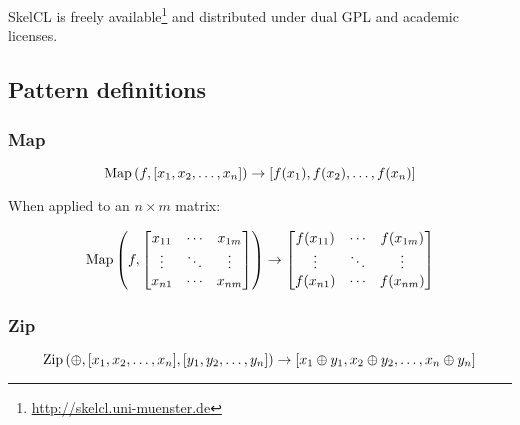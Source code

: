 SkelCL is freely
available\footnote{\url{http://skelcl.uni-muenster.de}} and
distributed under dual GPL and academic licenses.





\subsection{Pattern definitions}


\subsubsection{Map}

\begin{equation}
\operatorname*{Map}\left(f, [x_1,x_2,\ldots,x_n]\right) \to [f(x_1),f(x_2),\ldots,f(x_n)]
\end{equation}

When applied to an $n \times m$ matrix:

\begin{equation}
\operatorname*{Map}\left(f,
\begin{bmatrix}
  x_{11} & \cdots & x_{1m} \\
  \vdots & \ddots & \vdots \\
  x_{n1} & \cdots & x_{nm}
\end{bmatrix}\right)
\to
\begin{bmatrix}
  f(x_{11}) & \cdots & f(x_{1m}) \\
  \vdots & \ddots & \vdots \\
  f(x_{n1}) & \cdots & f(x_{nm})
\end{bmatrix}
\end{equation}

\subsubsection{Zip}

\begin{equation}
\operatorname*{Zip}\left( \oplus, [x_1,x_2,\ldots,x_n], [y_1,y_2,\ldots,y_n] \right)
\to
\left[ x_1 \oplus y_1, x_2 \oplus y_2, \ldots, x_n \oplus y_n \right]
\end{equation}

